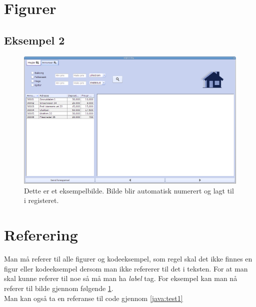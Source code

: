 \section{Figurer}
\subsection{Eksempel 2}
\begin{figure}[ht]
 \includegraphics[width=\textwidth,height=\textheight,keepaspectratio]{./img/bruksanvisning/1.png}
 \caption{Dette er et eksempelbilde. Bilde blir automatisk numerert og lagt til i registeret.}
 \label{fig:hovedvindu}
\end{figure}

\section{Referering}
Man må referer til alle figurer og kodeeksempel, som regel skal det ikke finnes en figur eller kodeeksempel dersom man ikke refererer til det i teksten. For at man skal kunne referer til noe så må man ha \textit{label} tag. For eksempel kan man nå referer til bilde gjennom følgende \ref{fig:hovedvindu}. \\
Man kan også ta en referanse til code gjennom \ref{java:test1}

